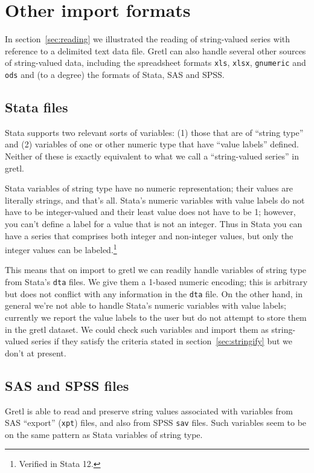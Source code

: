 \section{Other import formats}
\label{sec:other-imports}

In section~\ref{sec:reading} we illustrated the reading of
string-valued series with reference to a delimited text data
file. Gretl can also handle several other sources of string-valued
data, including the spreadsheet formats \texttt{xls}, \texttt{xlsx},
\texttt{gnumeric} and \texttt{ods} and (to a degree) the formats of
\textsf{Stata}, \textsf{SAS} and \textsf{SPSS}.

\subsection{Stata files}

Stata supports two relevant sorts of variables: (1) those that are of
``string type'' and (2) variables of one or other numeric type that
have ``value labels'' defined. Neither of these is exactly equivalent
to what we call a ``string-valued series'' in gretl.

Stata variables of string type have no numeric representation; their
values are literally strings, and that's all. Stata's numeric
variables with value labels do not have to be integer-valued and their
least value does not have to be 1; however, you can't define a label
for a value that is not an integer. Thus in Stata you can have a
series that comprises both integer and non-integer values, but only
the integer values can be labeled.\footnote{Verified in Stata 12.}

This means that on import to gretl we can readily handle variables of
string type from Stata's \texttt{dta} files. We give them a 1-based
numeric encoding; this is arbitrary but does not conflict with any
information in the \texttt{dta} file. On the other hand, in general
we're not able to handle Stata's numeric variables with value labels;
currently we report the value labels to the user but do not attempt to
store them in the gretl dataset. We could check such variables and
import them as string-valued series if they satisfy the criteria
stated in section~\ref{sec:stringify} but we don't at present.

\subsection{SAS and SPSS files}

Gretl is able to read and preserve string values associated with
variables from SAS ``export'' (\texttt{xpt}) files, and also from SPSS
\texttt{sav} files. Such variables seem to be on the same pattern as
Stata variables of string type.


